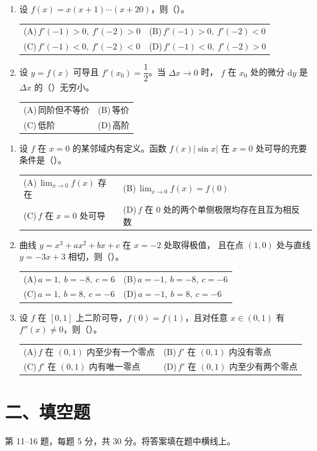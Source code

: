 \documentclass[UTF8,a4paper,zihao=-4,fontset=fandol]{ctexart}
\makeatletter
\newcommand{\choices}[4]{%
  \par\vspace{0.15em}
  \begin{tabularx}{\linewidth}{@{}X@{\hspace{1em}}X@{}}
    \textup{(A)}\,#1 & \textup{(B)}\,#2 \\
    \textup{(C)}\,#3 & \textup{(D)}\,#4
  \end{tabularx}\par}
\makeatother
\begin{document}
\begin{enumerate}[itemsep=0.4em,topsep=0.5em]
  \item 设 $f(x)=x(x+1)\cdots(x+20)$，则（\quad）。
  \choices{$f'(-1)>0,\ f'(-2)>0$}{$f'(-1)>0,\ f'(-2)<0$}
          {$f'(-1)<0,\ f'(-2)<0$}{$f'(-1)<0,\ f'(-2)>0$}

  \item 设 $y=f(x)$ 可导且 $f'(x_0)=\dfrac12$。当 $\Delta x\to0$ 时，
  $f$ 在 $x_0$ 处的微分 $\mathrm{d}y$ 是 $\Delta x$ 的（\quad）无穷小。
  \choices{同阶但不等价}{等价}{低阶}{高阶}
\end{enumerate}

\newpage
\begin{enumerate}[start=8,itemsep=0.4em,topsep=0pt]
  \item 设 $f$ 在 $x=0$ 的某邻域内有定义。函数 $f(x)|\sin x|$ 在 $x=0$ 处可导的充要条件是（\quad）。
  \choices{$\displaystyle\lim_{x\to0}f(x)$ 存在}
          {$\displaystyle\lim_{x\to0}f(x)=f(0)$}
          {$f$ 在 $x=0$ 处可导}
          {$f$ 在 $0$ 处的两个单侧极限均存在且互为相反数}

  \item 曲线 $y=x^3+ax^2+bx+c$ 在 $x=-2$ 处取得极值，
  且在点 $(1,0)$ 处与直线 $y=-3x+3$ 相切，则（\quad）。
  \choices{$a=1,\ b=-8,\ c=6$}{$a=-1,\ b=-8,\ c=-6$}
          {$a=1,\ b=8,\ c=-6$}{$a=-1,\ b=8,\ c=-6$}

  \item 设 $f$ 在 $[0,1]$ 上二阶可导，$f(0)=f(1)$，且对任意 $x\in(0,1)$ 有
  $f''(x)\ne0$，则（\quad）。
  \choices{$f$ 在 $(0,1)$ 内至少有一个零点}{$f'$ 在 $(0,1)$ 内没有零点}
          {$f'$ 在 $(0,1)$ 内有唯一零点}{$f'$ 在 $(0,1)$ 内至少有两个零点}
\end{enumerate}

\section*{二、填空题}
第 11--16 题，每题 5 分，共 30 分。将答案填在题中横线上。
\end{document}
